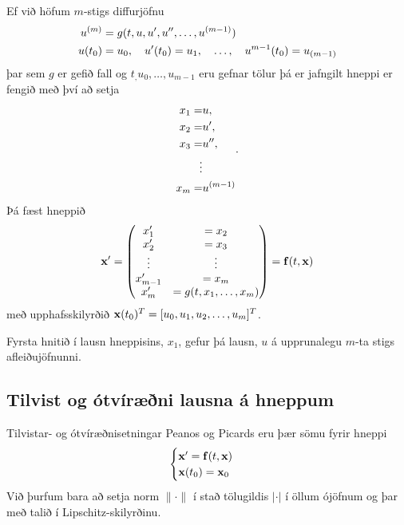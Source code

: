 \documentclass[letterpaper,10pt,icelandic]{sphinxmanual}
\begin{document}
Ef við höfum
\(m\)-stigs diffurjöfnu
\begin{gather}
\begin{split}\begin{aligned}
u^{(m)} &= g(t,u, u',u'',\ldots , u^{(m-1)})\\
u(t_0) &= u_0, \quad u'(t_0) = u_1, \quad \ldots, \quad  u^{m-1}(t_0) = u_{(m-1)}\end{aligned}\end{split}\notag
\end{gather}
þar sem \(g\) er gefið fall og \(t_, u_0, \ldots , u_{m-1}\) eru
gefnar tölur þá er jafngilt hneppi er fengið með því að setja
\begin{gather}
\begin{split}\begin{aligned}
x_1 =& u, \\
x_2 =& u', \\
x_3 =& u'', \\
\vdots& \\
x_m =& u^{(m-1)}\end{aligned}.\end{split}\notag
\end{gather}
Þá fæst hneppið
\begin{gather}
\begin{split}{\bf x}' =
\begin{pmatrix}
x_1' &= x_2 \\
x_2' &= x_3 \\
\vdots & \vdots\\
x_{m-1}' &= x_m \\
x_m' &= g(t,x_1, \ldots , x_m)
\end{pmatrix} =
{\bf f}(t,{\bf x})\end{split}\notag
\end{gather}
með upphafsskilyrðið \({\bf x}(t_0)^T = [u_0,u_1,u_2,\ldots,u_m]^T\).

Fyrsta hnitið í lausn hneppisins, \(x_1\), gefur þá lausn, \(u\)
á upprunalegu \(m\)-ta stigs afleiðujöfnunni.


\subsection{Tilvist og ótvíræðni lausna á hneppum}
\label{kafli06:tilvist-og-otviraeni-lausna-a-hneppum}
Tilvistar- og ótvíræðnisetningar Peanos og Picards eru þær sömu fyrir
hneppi
\begin{gather}
\begin{split}\begin{cases}
{\mbox{${\bf x}$}}' ={\mbox{${\bf f}$}}(t,{\mbox{${\bf x}$}})\\
{\mbox{${\bf x}$}}(t_0) = {\mbox{${\bf x}$}}_0
\end{cases}\end{split}\notag
\end{gather}
Við þurfum bara að setja norm \(\|\cdot\|\) í stað tölugildis
\(|\cdot|\) í öllum ójöfnum og þar með talið í Lipschitz-skilyrðinu.
\end{document}
